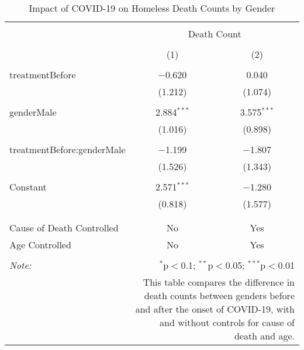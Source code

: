 
\begin{table}[!htbp] \centering 
  \caption{Impact of COVID-19 on Homeless Death Counts by Gender} 
  \label{} 
\begin{tabular}{@{\extracolsep{5pt}}lcc} 
\\[-1.8ex]\hline 
\hline \\[-1.8ex] 
 & \multicolumn{2}{c}{Death Count} \\ 
\cline{2-3} 
\\[-1.8ex] & (1) & (2)\\ 
\hline \\[-1.8ex] 
 treatmentBefore & $-$0.620 & 0.040 \\ 
  & (1.212) & (1.074) \\ 
  & & \\ 
 genderMale & 2.884$^{***}$ & 3.575$^{***}$ \\ 
  & (1.016) & (0.898) \\ 
  & & \\ 
 treatmentBefore:genderMale & $-$1.199 & $-$1.807 \\ 
  & (1.526) & (1.343) \\ 
  & & \\ 
 Constant & 2.571$^{***}$ & $-$1.280 \\ 
  & (0.818) & (1.577) \\ 
  & & \\ 
\hline \\[-1.8ex] 
Cause of Death Controlled & No & Yes \\ 
Age Controlled & No & Yes \\ 
\hline 
\hline \\[-1.8ex] 
\textit{Note:}  & \multicolumn{2}{r}{$^{*}$p$<$0.1; $^{**}$p$<$0.05; $^{***}$p$<$0.01} \\ 
 & \multicolumn{2}{r}{This table compares the difference in death counts between genders before and after the onset of COVID-19, with and without controls for cause of death and age.} \\ 
\end{tabular} 
\end{table} 
